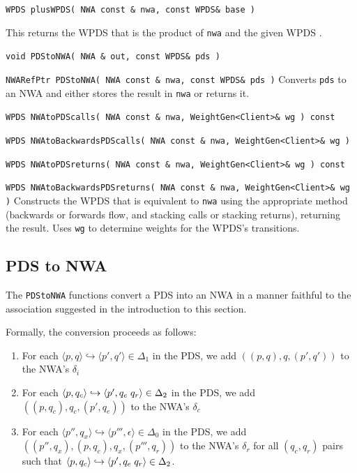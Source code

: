 \begin{description}

  \item\texttt{WPDS plusWPDS( NWA const \& nwa, const WPDS\& base )} \nopagebreak

    This returns the WPDS that is the
    product of \texttt{nwa} and the given WPDS
    \cite{advancedquerying}.

  \item\texttt{void PDStoNWA( NWA \& out, const WPDS\& pds )} \nopagebreak
  \item\texttt{NWARefPtr PDStoNWA( NWA const \& nwa, const WPDS\& pds )} \nopagebreak
    Converts \texttt{pds} to an NWA and either stores the result in
    \texttt{nwa} or returns it.


  \item\texttt{WPDS NWAtoPDScalls( NWA const \& nwa, WeightGen<Client>\& wg ) const} \nopagebreak
  \item\texttt{WPDS NWAtoBackwardsPDScalls( NWA const \& nwa, WeightGen<Client>\& wg )} \nopagebreak
  \item\texttt{WPDS NWAtoPDSreturns( NWA const \& nwa, WeightGen<Client>\& wg ) const} \nopagebreak
  \item\texttt{WPDS NWAtoBackwardsPDSreturns( NWA const \& nwa, WeightGen<Client>\& wg )} \nopagebreak
    Constructs the WPDS that is equivalent to \texttt{nwa} using the
    appropriate method (backwards or forwards flow, and stacking calls or
    stacking returns), returning the result. Uses \texttt{wg} to determine
    weights for the WPDS's transitions.
\end{description}


\subsection{PDS to NWA}
\label{Se:PDStoNWA}

The \texttt{PDStoNWA} functions convert a PDS into an NWA in a manner
faithful to the association suggested in the introduction to this section.

Formally, the conversion proceeds as follows:
\begin{enumerate}

\item For each $\langle p,q \rangle \hookrightarrow \langle p',q' \rangle \in
  \Delta_1$ in the PDS, we add $( (p,q), q, (p',q') )$ to the NWA's $\delta_i$

\item For each $\langle p,q_c \rangle \hookrightarrow \langle
  p',q_e \hspace{.1cm} q_r \rangle \in \Delta_2$ in the PDS, we add $(
  (p,q_c), q_c, (p',q_e) )$ to the NWA's $\delta_c$

\item For each $\langle p'',q_x \rangle \hookrightarrow \langle p''',\epsilon
  \rangle \in \Delta_0$ in the PDS, we add $( (p'',q_x), (p,q_c), q_x,
  (p''',q_r) )$ to the NWA's $\delta_r$ for all $(q_c,q_r)$ pairs such that
  $\langle p,q_c \rangle \hookrightarrow \langle p',q_e \hspace{.1cm} q_r
  \rangle \in \Delta_2$.

\end{enumerate}

